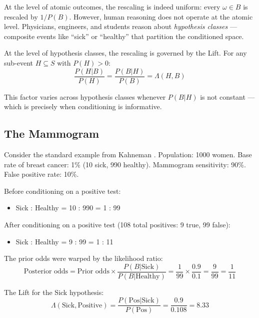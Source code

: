 \documentclass[12pt]{article}
\begin{document}
At the level of atomic outcomes, the rescaling is indeed uniform: every $\omega \in B$ is rescaled by $1/P(B)$. However, human reasoning does not operate at the atomic level. Physicians, engineers, and students reason about \textit{hypothesis classes} --- composite events like ``sick'' or ``healthy'' that partition the conditioned space.

At the level of hypothesis classes, the rescaling is governed by the Lift. For any sub-event $H \subseteq S$ with $P(H) > 0$:
\begin{equation}
\frac{P(H|B)}{P(H)} = \frac{P(B|H)}{P(B)} = \Lambda(H, B)
\end{equation}

This factor varies across hypothesis classes whenever $P(B|H)$ is not constant --- which is precisely when conditioning is informative.

\subsection{The Mammogram}

Consider the standard example from Kahneman \cite{kahneman2011}. Population: 1000 women. Base rate of breast cancer: 1\% (10 sick, 990 healthy). Mammogram sensitivity: 90\%. False positive rate: 10\%.

Before conditioning on a positive test:
\begin{itemize}[nosep]
\item Sick : Healthy = 10 : 990 = 1 : 99
\end{itemize}

After conditioning on a positive test (108 total positives: 9 true, 99 false):
\begin{itemize}[nosep]
\item Sick : Healthy = 9 : 99 = 1 : 11
\end{itemize}

The prior odds were warped by the likelihood ratio:
\begin{equation}
\text{Posterior odds} = \text{Prior odds} \times \frac{P(B|\text{Sick})}{P(B|\text{Healthy})} = \frac{1}{99} \times \frac{0.9}{0.1} = \frac{9}{99} = \frac{1}{11}
\end{equation}

The Lift for the Sick hypothesis:
\begin{equation}
\Lambda(\text{Sick}, \text{Positive}) = \frac{P(\text{Pos}|\text{Sick})}{P(\text{Pos})} = \frac{0.9}{0.108} = 8.33
\end{equation}
\end{document}
